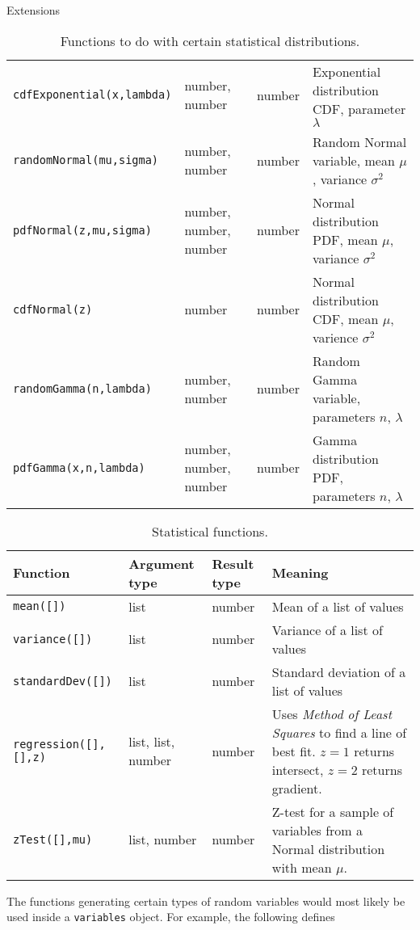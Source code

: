 \begin{chapter}{\label{cha:extensions}Extensions}
\begin{sidewaystable}[ht]
\begin{tabular}{lllp{20em}}
      \verb"cdfExponential(x,lambda)" & number, number & number & Exponential distribution CDF, parameter $\lambda$ \\
      \verb"randomNormal(mu,sigma)" & number, number & number & Random Normal variable, mean $\mu$, variance $\sigma^2$ \\
      \verb"pdfNormal(z,mu,sigma)" & number, number, number & number & Normal distribution PDF, mean $\mu$, variance $\sigma^2$ \\
  		\verb"cdfNormal(z)" & number & number & Normal distribution CDF, mean $\mu$, varience $\sigma^2$ \\
      \verb"randomGamma(n,lambda)" & number, number & number & Random Gamma variable, parameters $n$, $\lambda$ \\
      \verb"pdfGamma(x,n,lambda)" & number, number, number & number & Gamma distribution PDF, parameters $n$, $\lambda$ \\
      \hline\hline
  	\end{tabular}
  	\caption{\label{tab:statsfunctions1}
  		Functions to do with certain statistical distributions.
  	}
  \end{sidewaystable}
  \begin{sidewaystable}[ht]
  	\centering
  	\begin{tabular}{lllp{20em}}
  		\hline
  		Function & Argument type & Result type & Meaning \\
  		\hline
      \verb"mean([])"	& list & number	& Mean of a list of values \\
      \verb"variance([])" & list & number & Variance of a list of values \\
      \verb"standardDev([])" & list & number & Standard deviation of a list of values \\
      \verb"regression([],[],z)" & list, list, number & number & Uses \emph{Method of Least Squares} to find a line of best fit. 
      $z = 1$ returns intersect, $z = 2$ returns gradient. \\ 
      \verb"zTest([],mu)" & list, number & number & Z-test for a sample of variables from a Normal distribution with mean $\mu$.\\
      \hline\hline
  	\end{tabular}
  	\caption{\label{tab:statsfunctions2}
  		Statistical functions.
  	}
  \end{sidewaystable}
  The functions generating certain types of random variables would most likely
  be used inside a \verb"variables" object. For example, the following defines

\end{chapter}
